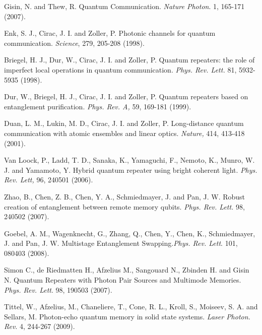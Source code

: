 \documentclass[11pt]{article}%
\begin{document}
\begin{enumerate}[ {[}1{]} ]
\item \label{ref30} Gisin, N. and Thew, R. Quantum Communication. \textit{Nature Photon}. 1, 165-171 (2007).

\item \label{ref31} Enk, S. J., Cirac, J. I. and Zoller, P. Photonic channels for quantum communication. \textit{Science}, 279, 205-208 (1998).

\item \label{ref32} Briegel, H. J., Dur, W., Cirac, J. I. and Zoller, P. Quantum repeaters: the role of imperfect local operations in quantum communication. \textit{Phys. Rev. Lett.} 81, 5932-5935 (1998).

\item \label{ref33} Dur, W., Briegel, H. J., Cirac, J. I. and Zoller, P. Quantum repeaters based on entanglement purification. \textit{Phys. Rev. A, }59, 169-181 (1999).

\item \label{ref34} Duan, L. M., Lukin, M. D., Cirac, J. I. and Zoller, P. Long-distance quantum communication with atomic ensembles and linear optics. \textit{Nature,} 414, 413-418 (2001).

\item \label{ref35} Van Loock, P., Ladd, T. D., Sanaka, K., Yamaguchi, F., Nemoto, K., Munro, W. J. and Yamamoto, Y. Hybrid quantum repeater using bright coherent light. \textit{Phys. Rev. Lett, }96, 240501 (2006).

\item \label{ref36} Zhao, B., Chen, Z. B., Chen, Y. A., Schmiedmayer, J. and Pan, J. W. Robust creation of entanglement between remote memory qubits.\textit{ Phys. Rev. Lett. }98, 240502 (2007).

\item \label{ref37} Goebel, A. M., Wagenknecht, G., Zhang, Q., Chen, Y., Chen, K., Schmiedmayer, J. and Pan, J. W. Multistage Entanglement Swapping.\textit{Phys. Rev. Lett}. 101, 080403 (2008).

\item \label{ref38} Simon C., de Riedmatten H., Afzelius M., Sangouard N., Zbinden H. and Gisin N. Quantum Repeaters with Photon Pair Sources and Multimode Memories. \textit{Phys. Rev. Lett}. 98, 190503 (2007).

\item \label{ref39} Tittel, W., Afzelius, M., Chaneliere, T., Cone, R. L., Kroll, S., Moiseev, S. A. and Sellars, M. Photon-echo quantum memory in solid state systems. \textit{Laser Photon. Rev}. 4, 244-267 (2009).


\end{enumerate}
\end{document}
